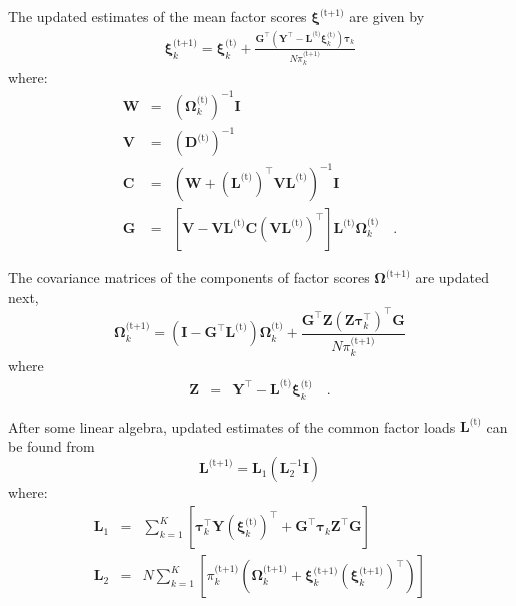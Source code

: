 \documentclass[twocolumn]{aastex61}
\newcommand{\vect}[1]{\boldsymbol{\mathbf{#1}}}
\renewcommand{\vec}[1]{\vect{#1}}
\newcommand{\weight}{\pi}
\newcommand{\data}{\textbf{Y}}
\newcommand{\vecdata}{\vec\data}
\newcommand{\nextstep}{^\textrm{(t+1)}}
\newcommand{\thisstep}{^\textrm{(t)}}
\newcommand{\transpose}{^\intercal}
\newcommand{\eye}{\textbf{I}}
\newcommand{\factorloads}{\textbf{L}}
\newcommand{\specificvariance}{\vec{D}}
\newcommand{\scoremeans}{\vec\xi}
\newcommand{\scorecovs}{\vec\Omega}
\begin{document}
The updated estimates of the mean factor scores 
$\scoremeans\nextstep$ are given by
\begin{eqnarray}
	\scoremeans_{k}\nextstep = \scoremeans_{k}\thisstep + \frac{\vec{G}\transpose(\vecdata\transpose - \factorloads\thisstep\scoremeans_{k}\thisstep)\vec\tau_{k}}{N\weight_k\nextstep}
\end{eqnarray}
\noindent{}where:
\begin{eqnarray}
	\vec{W} &=& (\scorecovs_{k}\thisstep)^{-1}\eye \\
	\vec{V} &=& \left(\specificvariance\thisstep\right)^{-1} \\
	\vec{C} &=& (\vec{W} + (\factorloads\thisstep)\transpose\vec{V}\factorloads\thisstep)^{-1}\eye \\
	\vec{G} &=& \left[\vec{V} - \vec{V}\factorloads\thisstep\vec{C}\left(\vec{V}\factorloads\thisstep\right)\transpose\right]\factorloads\thisstep\scorecovs_k\thisstep \quad .
\end{eqnarray}

The covariance matrices of the components of factor scores $\scorecovs\nextstep$
are updated next,
\begin{equation}
	\scorecovs_k\nextstep = \left(\eye - \vec{G}\transpose\factorloads\thisstep\right)\scorecovs_k\thisstep + \frac{\vec{G}\transpose\vec{Z}\left(\vec{Z}\vec\tau_k\transpose\right)\transpose\vec{G}}{N\weight_k\nextstep}
\end{equation}
\noindent{}where
\begin{eqnarray}
	\vec{Z} &=& \vecdata\transpose - \factorloads\thisstep\scoremeans_k\thisstep \quad .
\end{eqnarray}

After some linear algebra, updated estimates of the common factor loads $\factorloads\thisstep$
can be found from
\begin{equation}
	\factorloads\nextstep = \factorloads_{1}\left(\factorloads_{2}^{-1}\eye\right)
\end{equation}
\noindent{}where:
\begin{eqnarray}
	\factorloads_1 &=& \sum_{k=1}^{K}\left[ \vec\tau_k\transpose\vecdata\left(\scoremeans_k\thisstep\right)\transpose + 
	\vec{G}\transpose\vec\tau_k\vec{Z}\transpose\vec{G}\right] \\
	\factorloads_2 &=& N\sum_{k=1}^{K}\left[\weight_k\nextstep\left(\scorecovs_k\nextstep + \scoremeans_k\nextstep\left(\scoremeans_k\nextstep\right)\transpose\right)\right]
\end{eqnarray}
\end{document}
